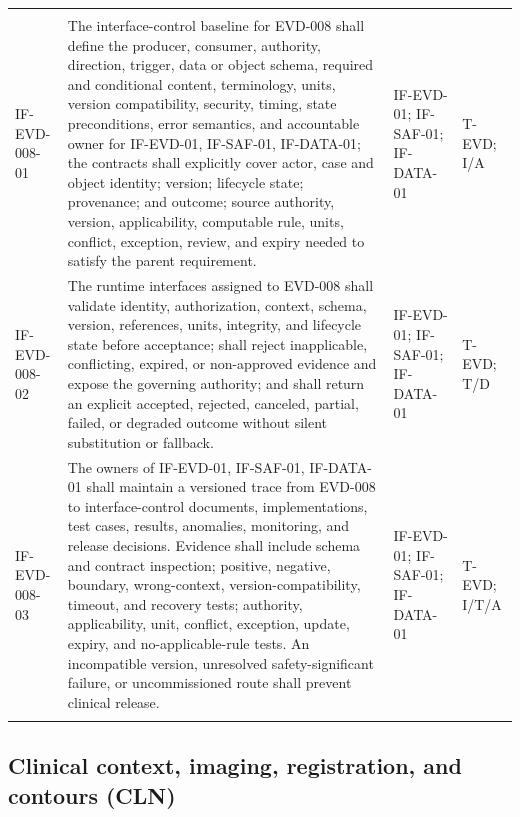 \documentclass[11pt,letterpaper]{article}
\begin{document}
\begin{scriptsize}
\begin{longtable}{@{}L{0.14\textwidth}L{0.49\textwidth}L{0.19\textwidth}L{0.10\textwidth}@{}}
\addlinespace[2pt]
 \\
\addlinespace[2pt]
\mbox{IF-EVD-008-01} & The interface-control baseline for EVD-008 shall define the producer, consumer, authority, direction, trigger, data or object schema, required and conditional content, terminology, units, version compatibility, security, timing, state preconditions, error semantics, and accountable owner for IF-EVD-01, IF-SAF-01, IF-DATA-01; the contracts shall explicitly cover actor, case and object identity; version; lifecycle state; provenance; and outcome; source authority, version, applicability, computable rule, units, conflict, exception, review, and expiry needed to satisfy the parent requirement. & IF-EVD-01; IF-SAF-01; IF-DATA-01 & T-EVD; I\slash\allowbreak{}A \\
\addlinespace[2pt]
\mbox{IF-EVD-008-02} & The runtime interfaces assigned to EVD-008 shall validate identity, authorization, context, schema, version, references, units, integrity, and lifecycle state before acceptance; shall reject inapplicable, conflicting, expired, or non-approved evidence and expose the governing authority; and shall return an explicit accepted, rejected, canceled, partial, failed, or degraded outcome without silent substitution or fallback. & IF-EVD-01; IF-SAF-01; IF-DATA-01 & T-EVD; T\slash\allowbreak{}D \\
\addlinespace[2pt]
\mbox{IF-EVD-008-03} & The owners of IF-EVD-01, IF-SAF-01, IF-DATA-01 shall maintain a versioned trace from EVD-008 to interface-control documents, implementations, test cases, results, anomalies, monitoring, and release decisions. Evidence shall include schema and contract inspection; positive, negative, boundary, wrong-context, version-compatibility, timeout, and recovery tests; authority, applicability, unit, conflict, exception, update, expiry, and no-applicable-rule tests. An incompatible version, unresolved safety-significant failure, or uncommissioned route shall prevent clinical release. & IF-EVD-01; IF-SAF-01; IF-DATA-01 & T-EVD; I\slash\allowbreak{}T\slash\allowbreak{}A \\
\addlinespace[2pt]
\end{longtable}
\end{scriptsize}

\subsection{Clinical context, imaging, registration, and contours (CLN)}
\end{document}
